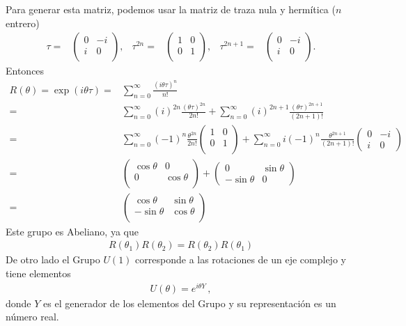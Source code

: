 Para generar esta matriz, podemos usar la matriz de traza nula y hermítica ($n$ entrero)
\begin{align*}
  \tau=&
  \begin{pmatrix}
   0 &-i\\ %
   i &0\\  %
  \end{pmatrix},&\tau^{2n}=&  \begin{pmatrix}
   1 &0\\
   0 &1\\ 
  \end{pmatrix},&\tau^{2n+1}=&  \begin{pmatrix}
   0 &-i\\
   i &0\\ 
  \end{pmatrix}.
\end{align*}
Entonces
\begin{align}
\label{eq:so2}
  R(\theta)=\exp \left( i \theta\tau \right)=&\sum_{n=0}^{\infty}\frac{\left(i \theta\tau \right)^{n}}{n!}\nonumber\\
=&\sum_{n=0}^{\infty}(i)^{2n}\frac{\left( \theta\tau \right)^{2n}}{2n!}+\sum_{n=0}^{\infty}(i)^{2n+1}\frac{\left( \theta\tau \right)^{2n+1}}{(2n+1)!}\nonumber\\
  =&\sum_{n=0}^{\infty}(-1)^{n}\frac{\theta^{2n}}{2n!}
  \begin{pmatrix}
    1 & 0\\
    0 & 1\\
  \end{pmatrix}
+\sum_{n=0}^{\infty}i(-1)^{n}\frac{ \theta^{2n+1}}{(2n+1)!}
\begin{pmatrix}
  0 & -i \\
  i & 0
\end{pmatrix}
\nonumber\\
    =&
  \begin{pmatrix}
    \cos\theta & 0\\
    0 & \cos\theta \\
  \end{pmatrix}
+
\begin{pmatrix}
  0 & \sin\theta \\
  -\sin\theta & 0
\end{pmatrix}
\nonumber\\
    =&
  \begin{pmatrix}
    \cos\theta & \sin\theta\\
     -\sin\theta& \cos\theta \\
  \end{pmatrix}
\end{align}
Este grupo es Abeliano, ya que
\begin{align}
  R(\theta_1)R(\theta_2)=R(\theta_2)R(\theta_1)
\end{align}
De otro lado el Grupo $U(1)$ corresponde a las rotaciones de un eje complejo y tiene elementos
\begin{align}
  U(\theta)=e^{i \theta Y}\,,
\end{align}
donde $Y$ es el generador de los elementos del Grupo y su representación es un número real. 

